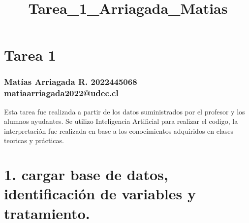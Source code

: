 \documentclass[11pt]{article}
\title{Tarea\_1\_Arriagada\_Matias}
\begin{document}
    
    \maketitle
    
    

    
    \section{Tarea 1}\label{tarea-1}

\subsubsection{Matías Arriagada R. \textbar{} 2022445068 \textbar{}
matiaarriagada2022@udec.cl}\label{matuxedas-arriagada-r.-2022445068-matiaarriagada2022udec.cl}

Esta tarea fue realizada a partir de los datos suministrados por el
profesor y los alumnos ayudantes. Se utilizo Inteligencia Artificial
para realizar el codigo, la interpretación fue realizada en base a los
conocimientos adquiridos en clases teoricas y prácticas.

    \section{1. cargar base de datos, identificación de variables y
tratamiento.}\label{cargar-base-de-datos-identificaciuxf3n-de-variables-y-tratamiento.}
\end{document}
